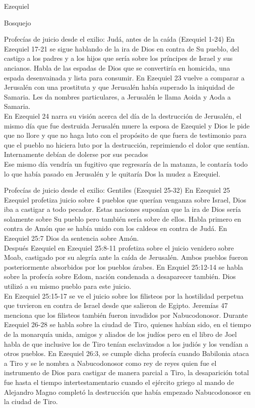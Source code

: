 \begin{section}{Ezequiel}
\begin{subsection}{Bosquejo}
\begin{subsubsection}{Profecías de juicio desde el exilio: Judá, antes de la caída (Ezequiel 1-24)}
En Ezequiel 17-21 se sigue hablando de la ira de Dios en contra de Su pueblo, del castigo a los padres y a los hijos que sería sobre los príncipes de Israel y sus ancianos. Habla de las espadas de Dios que se convertiría en homicida, una espada desenvainada y lista para consumir. En Ezequiel 23 vuelve a comparar a Jerusalén con una prostituta y que Jerusalén había superado la iniquidad de Samaria. Les da nombres particulares, a Jerusalén le llama Aoida y Aoda a Samaria.\\
En Ezequiel 24 narra su visión acerca del día de la destrucción de Jerusalén, el mismo día que fue destruida Jerusalén muere la esposa de Ezequiel y Dios le pide que no llore y que no haga luto con el propósito de que fuera de testimonio para que el pueblo no hiciera luto por la destrucción, reprimiendo el dolor que sentían. Internamente debían de dolerse por sus pecados\\
Ese mismo día vendría un fugitivo que regresaría de la matanza, le contaría todo lo que había pasado en Jerusalén y le quitaría Dos la mudez a Ezequiel.
	\end{subsubsection}
	\begin{subsubsection}{Profecías de juicio desde el exilio: Gentiles (Ezequiel 25-32)}
En Ezequiel 25 Ezequiel profetiza juicio sobre 4 pueblos que querían venganza sobre Israel, Dios iba a castigar a todo pecador. Estas naciones suponían que la ira de Dios sería solamente sobre Su pueblo pero también sería sobre de ellos. Habla primero en contra de Amón que se había unido con los caldeos en contra de Judá. En Ezequiel 25:7 Dios da sentencia sobre Amón.\\
Después Ezequiel en Ezequiel 25:8-11 profetiza sobre el juicio venidero sobre Moab, castigado por su alegría ante la caída de Jerusalén. Ambos pueblos fueron posteriormente absorbidos por los pueblos árabes. En Ezquiel 25:12-14 se habla sobre la profecía sobre Edom, nación condenada a desaparecer también. Dios utilizó a su mismo pueblo para este juicio.\\
En Ezequiel 25:15-17 se ve el juicio sobre los filisteos por la hostilidad perpetua que tuvieron en contra de Israel desde que salieron de Egipto. Jeremías 47 menciona que los filisteos también fueron invadidos por Nabucodonosor.
Durante Ezequiel 26-28 se habla sobre la ciudad de Tiro, quienes habían sido, en el tiempo de la monarquía unida, amigos y aliados de los judíos pero en el libro de Joel habla de que inclusive los de Tiro tenían esclavizados a los judiós y los vendían a otros pueblos. 
\newpage
En Ezequiel 26:3, se cumple dicha profecía cuando Babilonia ataca a Tiro y se le nombra a Nabucodonosor como rey de reyes quien fue el instrumento de Dios para castigar de manera parcial a Tiro, la desaparición total fue hasta el tiempo intertestamentario cuando el ejército griego al mando de Alejandro Magno completó la destrucción que había empezado Nabucodonosor en la ciudad de Tiro.\\

\end{subsubsection}
\end{subsection}
\end{section}

